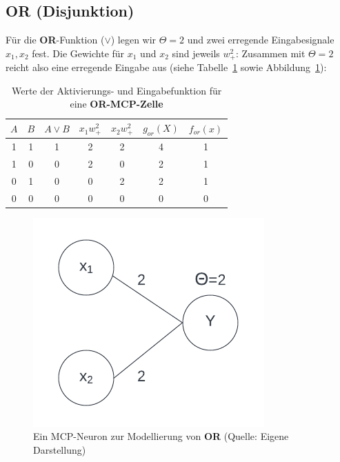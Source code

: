 {\subsection*{OR (Disjunktion)}

Für die \textbf{OR}-Funktion ($\lor$) legen wir $\Theta = 2$ und zwei erregende Eingabesignale $x_1, x_2$ fest.
Die Gewichte für $x_1$ und $x_2$ sind jeweils $w^2_+$: Zusammen mit $\Theta = 2$ reicht also eine erregende Eingabe aus (siehe Tabelle~\ref{tab:mcp-or} sowie Abbildung~\ref{fig:mcpor}):


\begin{table} %
    \centering
    \begin{tabular}{c | c | c |c | c | c|c}
 $A$ & $B$ & $A \lor B$ & $x_1w^2_+$ & $x_2w^2_+$ & $g_{or}(X)$ & $f_{or}(x)$ \\
\hline
 1   & 1   & 1          & 2     & 2     & 4           & 1            \\
 1   & 0   & 0          & 2     & 0     & 2           & 1            \\
 0   & 1   & 0          & 0     & 2     & 2           & 1            \\
 0   & 0   & 0          & 0     & 0     & 0           & 0            \\
\end{tabular}
\caption{Werte der Aktivierungs- und Eingabefunktion für eine \textbf{OR-MCP-Zelle}}
\label{tab:mcp-or}
\end{table}


\begin{figure}[h]
    \centering
    \includegraphics{chapters/3. Kuenstliche Neuronen/mcpor}
    \caption{Ein MCP-Neuron zur Modellierung von \textbf{OR} (Quelle: Eigene Darstellung)}
    \label{fig:mcpor}
\end{figure}


}
